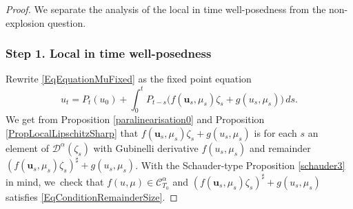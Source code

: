 \documentclass[10pt]{amsart}
\theoremstyle{definition}
\newcommand{\mcD}{\mathcal{D}}
\newcommand{\bsu}{\boldsymbol{u}}
\begin{document}
\begin{proof}
We separate the analysis of the local in time well-posedness from the non-explosion question. 

\subsubsection*{Step 1. Local in time well-posedness} Rewrite \eqref{EqEquationMuFixed} as the fixed point equation
\[
u_t = P_t (u_0) + \int_0^t P_{t-s}\bigl(f(\bsu_s,\mu_s)\zeta_s + g(u_s, \mu_s)\bigr)\,ds.
\]
We get from Proposition \ref{paralinearisation0} and Proposition \ref{PropLocalLipschitzSharp} that $f(\bsu_s,\mu_s)\zeta_s + g(u_s, \mu_s)$ is for each $s$ an element of $\mcD^\alpha(\zeta_s)$ with Gubinelli derivative $f(u_s,\mu_s)$ and remainder $(f(\bsu_s,\mu_s)\zeta_s)^\sharp + g(u_s,\mu_s)$. With the Schauder-type Proposition \ref{schauder3} in mind, we~check that $f(u,\mu)\in\mathscr{C}^\alpha_{T_0}$ and $(f(\bsu_s,\mu_s)\zeta_s)^\sharp + g(u_s,\mu_s)$ satisfies \eqref{EqConditionRemainderSize}.


\end{proof}
\end{document}
